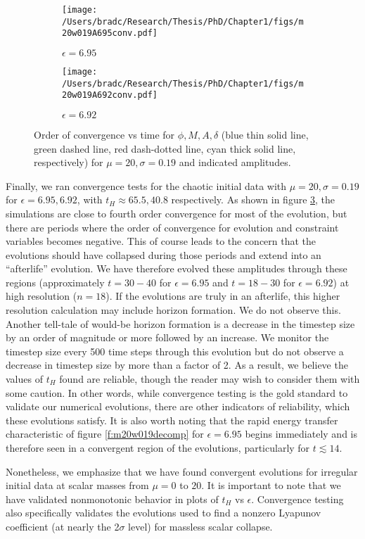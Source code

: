 \documentclass[../PhD.tex]{subfiles}
\begin{document}
\begin{subappendices}
\begin{figure}[!t]
\centering
\begin{subfigure}[t]{0.47\textwidth}
\texttt{[image: /Users/bradc/Research/Thesis/PhD/Chapter1/figs/m20w019A695conv.pdf]}
\caption{$\epsilon=6.95$}
\label{f:m20w019A695conv}
\end{subfigure}
\begin{subfigure}[t]{0.47\textwidth}
\texttt{[image: /Users/bradc/Research/Thesis/PhD/Chapter1/figs/m20w019A692conv.pdf]}
\caption{$\epsilon=6.92$}
\label{f:m20w019A692conv}
\end{subfigure}
\caption[Order of convergence for $\phi$, $M$, $A$, $\delta$ as a function of time for $\mu = 20$ at nearby amplitudes]{Order of convergence vs time for $\phi,M,A,\delta$ (blue thin solid 
line, green dashed line, red dash-dotted line, cyan thick solid line, 
respectively) for $\mu=20,\sigma=0.19$ and indicated amplitudes. 
}
\label{f:m20w019convergence}
\end{figure}


Finally, we ran convergence tests for the chaotic initial data with
$\mu=20,\sigma=0.19$ for $\epsilon=6.95,6.92$, with $t_H\approx 65.5,40.8$
respectively.  As shown in figure \ref{f:m20w019convergence}, the simulations
are close to fourth order convergence for most of the evolution, but
there are periods where the order of convergence for evolution and constraint
variables becomes negative.  This of course leads to the concern that the
evolutions should have collapsed during those periods and extend into an
``afterlife'' evolution.  We have therefore
evolved these amplitudes through these regions (approximately $t=30-40$ for
$\epsilon=6.95$ and $t=18-30$ for $\epsilon=6.92$) at high resolution ($n=18$).
If the evolutions are truly in an afterlife, this higher resolution 
calculation may include horizon formation.  We do not observe this.  Another
tell-tale of would-be horizon formation is a decrease in the timestep size
by an order of magnitude or more followed by an increase.  We monitor
the timestep size every 500 time steps through this evolution but do not
observe a decrease in timestep size by more than a factor of 2.  As a result,
we believe the values of $t_H$ found are reliable, though the reader may 
wish to consider them with some caution.  In other words, while convergence
testing is the gold standard to validate our numerical evolutions, there are
other indicators of reliability, which these evolutions satisfy.  It is
also worth noting that the rapid energy transfer characteristic of figure
\ref{f:m20w019decomp} for $\epsilon=6.95$ begins immediately and is therefore
seen in a convergent region of the evolutions, particularly for $t\lesssim 14$.

Nonetheless, we emphasize that we have found convergent evolutions for
irregular initial data at scalar masses from $\mu=0$ to $20$.  It is
important to note that we have validated nonmonotonic behavior in plots of
$t_H$ vs $\epsilon$.  Convergence testing also specifically validates the
evolutions used to find a nonzero Lyapunov coefficient (at nearly the 2$\sigma$
level) for massless scalar collapse.

\end{subappendices}



\end{document}
